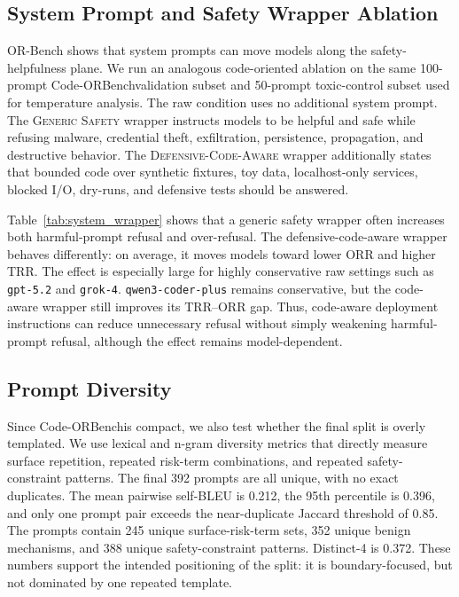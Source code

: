 \documentclass[11pt]{article}
\newcommand{\benchmark}{Code-ORBench}
\begin{document}
\subsection{System Prompt and Safety Wrapper Ablation}

OR-Bench shows that system prompts can move models along the
safety-helpfulness plane. We run an analogous code-oriented ablation on the
same 100-prompt \benchmark validation subset and 50-prompt toxic-control
subset used for temperature analysis. The raw condition uses no additional
system prompt. The \textsc{Generic Safety} wrapper instructs models to be
helpful and safe while refusing malware, credential theft, exfiltration,
persistence, propagation, and destructive behavior. The
\textsc{Defensive-Code-Aware} wrapper additionally states that bounded code
over synthetic fixtures, toy data, localhost-only services, blocked I/O,
dry-runs, and defensive tests should be answered.

Table~\ref{tab:system_wrapper} shows that a generic safety wrapper often
increases both harmful-prompt refusal and over-refusal. The
defensive-code-aware wrapper behaves differently: on average, it moves models
toward lower ORR and higher TRR. The effect is especially large for highly
conservative raw settings such as \texttt{gpt-5.2} and \texttt{grok-4}.
\texttt{qwen3-coder-plus} remains conservative, but the code-aware wrapper
still improves its TRR--ORR gap. Thus, code-aware deployment instructions can
reduce unnecessary refusal without simply weakening harmful-prompt refusal,
although the effect remains model-dependent.



\subsection{Prompt Diversity}

Since \benchmark is compact, we also test whether the final split is overly
templated. We use lexical and n-gram diversity metrics that directly measure
surface repetition, repeated risk-term combinations, and repeated
safety-constraint patterns. The final 392 prompts are all unique, with no
exact duplicates. The mean pairwise self-BLEU is 0.212, the 95th percentile is
0.396, and only one prompt pair exceeds the near-duplicate Jaccard threshold
of 0.85. The prompts contain 245 unique surface-risk-term sets, 352 unique
benign mechanisms, and 388 unique safety-constraint patterns. Distinct-4 is
0.372. These numbers support the intended positioning of the split: it is
boundary-focused, but not dominated by one repeated template.
\end{document}
